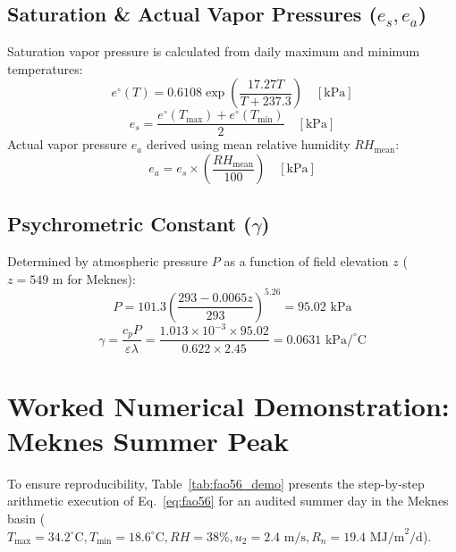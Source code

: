 \documentclass[11pt,a4paper,oneside]{report}
\begin{document}
\subsection{Saturation \& Actual Vapor Pressures ($e_s, e_a$)}
Saturation vapor pressure is calculated from daily maximum and minimum temperatures:
\begin{equation}
e^\circ(T) = 0.6108 \exp\left( \frac{17.27 T}{T + 237.3} \right) \quad [\text{kPa}]
\end{equation}
\begin{equation}
e_s = \frac{e^\circ(T_{\max}) + e^\circ(T_{\min})}{2} \quad [\text{kPa}]
\end{equation}
Actual vapor pressure $e_a$ derived using mean relative humidity $RH_{\text{mean}}$:
\begin{equation}
e_a = e_s \times \left( \frac{RH_{\text{mean}}}{100} \right) \quad [\text{kPa}]
\end{equation}

\subsection{Psychrometric Constant ($\gamma$)}
Determined by atmospheric pressure $P$ as a function of field elevation $z$ ($z = 549\text{ m}$ for Meknes):
\begin{equation}
P = 101.3 \left( \frac{293 - 0.0065 z}{293} \right)^{5.26} = 95.02\text{ kPa}
\end{equation}
\begin{equation}
\gamma = \frac{c_p P}{\varepsilon \lambda} = \frac{1.013 \times 10^{-3} \times 95.02}{0.622 \times 2.45} = 0.0631\text{ kPa/}^\circ\text{C}
\end{equation}

\section{Worked Numerical Demonstration: Meknes Summer Peak}
To ensure reproducibility, Table~\ref{tab:fao56_demo} presents the step-by-step arithmetic execution of Eq.~\ref{eq:fao56} for an audited summer day in the Meknes basin ($T_{\max}=34.2^\circ\text{C}, T_{\min}=18.6^\circ\text{C}, RH=38\%, u_2=2.4\text{ m/s}, R_n=19.4\text{ MJ/m}^2/\text{d}$).
\end{document}
